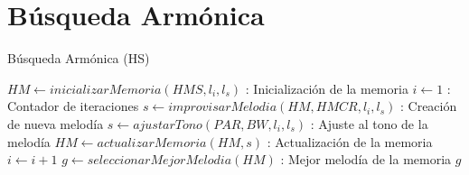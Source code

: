 \documentclass[10pt,letterpaper,twoside,openright]{article}
\begin{document}
		 \newpage
		 
	\section{Búsqueda Armónica}
	
		\begin{algorithm}[H]
			\caption{Búsqueda Armónica (HS)}
				$ HM \leftarrow inicializarMemoria(HMS,l_{i},l_{s})$ : Inicialización de la memoria\;
				$ i \leftarrow 1 $ : Contador de iteraciones\;
				{
					$s \leftarrow improvisarMelodia(HM, HMCR,l_{i},l_{s})$ : Creación de nueva melodía\;
					$s \leftarrow ajustarTono(PAR, BW,l_{i},l_{s})$ : Ajuste al tono de la melodía\;
					$HM \leftarrow actualizarMemoria(HM,s) $ : Actualización de la memoria\;
					$ i \leftarrow  i + 1 $\;
				}
				$ g \leftarrow seleccionarMejorMelodia(HM) $ : Mejor melodía de la memoria\;
		 		\Return $ g $
		 \end{algorithm}
\end{document}
